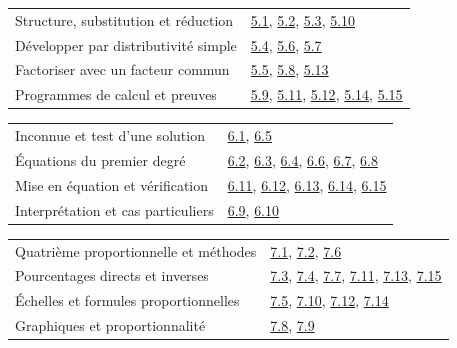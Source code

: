 \begin{tabularx}{\linewidth}{@{}Yl@{}}\toprule
Structure, substitution et réduction & \hyperref[exo-5-1]{5.1}, \hyperref[exo-5-2]{5.2}, \hyperref[exo-5-3]{5.3}, \hyperref[exo-5-10]{5.10}\\[2mm]
Développer par distributivité simple & \hyperref[exo-5-4]{5.4}, \hyperref[exo-5-6]{5.6}, \hyperref[exo-5-7]{5.7}\\[2mm]
Factoriser avec un facteur commun & \hyperref[exo-5-5]{5.5}, \hyperref[exo-5-8]{5.8}, \hyperref[exo-5-13]{5.13}\\[2mm]
Programmes de calcul et preuves & \hyperref[exo-5-9]{5.9}, \hyperref[exo-5-11]{5.11}, \hyperref[exo-5-12]{5.12}, \hyperref[exo-5-14]{5.14}, \hyperref[exo-5-15]{5.15}\\[2mm]
\bottomrule\end{tabularx}\par\vspace{4mm}
\begin{tabularx}{\linewidth}{@{}Yl@{}}\toprule
Inconnue et test d’une solution & \hyperref[exo-6-1]{6.1}, \hyperref[exo-6-5]{6.5}\\[2mm]
Équations du premier degré & \hyperref[exo-6-2]{6.2}, \hyperref[exo-6-3]{6.3}, \hyperref[exo-6-4]{6.4}, \hyperref[exo-6-6]{6.6}, \hyperref[exo-6-7]{6.7}, \hyperref[exo-6-8]{6.8}\\[2mm]
Mise en équation et vérification & \hyperref[exo-6-11]{6.11}, \hyperref[exo-6-12]{6.12}, \hyperref[exo-6-13]{6.13}, \hyperref[exo-6-14]{6.14}, \hyperref[exo-6-15]{6.15}\\[2mm]
Interprétation et cas particuliers & \hyperref[exo-6-9]{6.9}, \hyperref[exo-6-10]{6.10}\\[2mm]
\bottomrule\end{tabularx}\par\vspace{4mm}
\clearpage
{}\fontsize{10}{13}\selectfont
{}\begin{tabularx}{\linewidth}{@{}Yl@{}}\toprule
Quatrième proportionnelle et méthodes & \hyperref[exo-7-1]{7.1}, \hyperref[exo-7-2]{7.2}, \hyperref[exo-7-6]{7.6}\\[2mm]
Pourcentages directs et inverses & \hyperref[exo-7-3]{7.3}, \hyperref[exo-7-4]{7.4}, \hyperref[exo-7-7]{7.7}, \hyperref[exo-7-11]{7.11}, \hyperref[exo-7-13]{7.13}, \hyperref[exo-7-15]{7.15}\\[2mm]
Échelles et formules proportionnelles & \hyperref[exo-7-5]{7.5}, \hyperref[exo-7-10]{7.10}, \hyperref[exo-7-12]{7.12}, \hyperref[exo-7-14]{7.14}\\[2mm]
Graphiques et proportionnalité & \hyperref[exo-7-8]{7.8}, \hyperref[exo-7-9]{7.9}\\[2mm]
\bottomrule\end{tabularx}\par\vspace{4mm}
